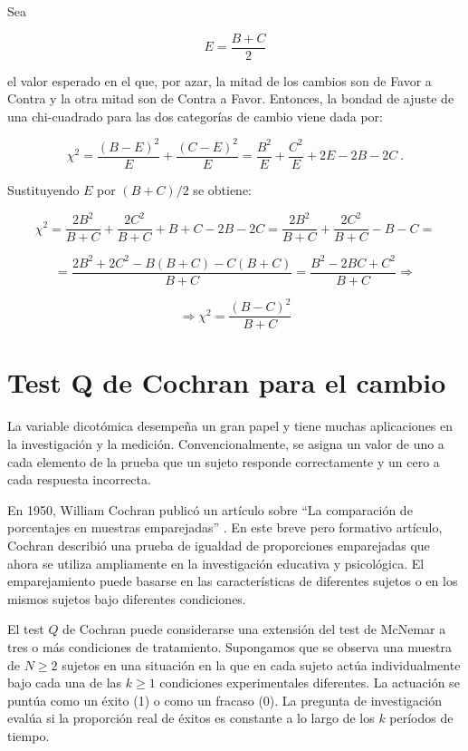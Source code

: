\documentclass[12pt,a4paper,]{book}
\numberwithin{dummy}{section}
\theoremstyle{ocrenumbox}
\theoremstyle{blacknumex}
\theoremstyle{blacknumbox}
\theoremstyle{ocrenum}
\theoremstyle{ocrenum}
\begin{document}
Sea

\[
E=\frac{B+C}{2}
\]

el valor esperado en el que, por azar, la mitad de los cambios son de
Favor a Contra y la otra mitad son de Contra a Favor. Entonces, la
bondad de ajuste de una chi-cuadrado para las dos categorías de cambio
viene dada por:

\[
\chi^2=\frac{(B-E)^2}{E}+\frac{(C-E)^2}{E}=\frac{B^2}{E}+\frac{C^2}{E}+2E-2B-2C~.
\]

Sustituyendo \(E\) por \((B + C)/2\) se obtiene:

\[
\chi^2=\frac{2B^2}{B+C}+\frac{2C^2}{B+C}+B+C-2B-2C=\frac{2B^2}{B+C}+\frac{2C^2}{B+C}-B-C=
\]

\[
=\frac{2B^2+2C^2-B(B+C)-C(B+C)}{B+C}=\frac{B^2-2BC+C^2}{B+C} \Rightarrow
\]

\[
\Rightarrow \chi^2=\frac{(B-C)^2}{B+C}
\]

\hypertarget{test-q-de-cochran-para-el-cambio}{%
\section{Test Q de Cochran para el
cambio}\label{test-q-de-cochran-para-el-cambio}}

La variable dicotómica desempeña un gran papel y tiene muchas
aplicaciones en la investigación y la medición. Convencionalmente, se
asigna un valor de uno a cada elemento de la prueba que un sujeto
responde correctamente y un cero a cada respuesta incorrecta.

En 1950, William Cochran publicó un artículo sobre ``La comparación de
porcentajes en muestras emparejadas'' \citep{Cochran1950}. En este breve
pero formativo artículo, Cochran describió una prueba de igualdad de
proporciones emparejadas que ahora se utiliza ampliamente en la
investigación educativa y psicológica. El emparejamiento puede basarse
en las características de diferentes sujetos o en los mismos sujetos
bajo diferentes condiciones.

El test \(Q\) de Cochran puede considerarse una extensión del test de
McNemar a tres o más condiciones de tratamiento. Supongamos que se
observa una muestra de \(N \ge 2\) sujetos en una situación en la que en
cada sujeto actúa individualmente bajo cada una de las \(k \ge 1\)
condiciones experimentales diferentes. La actuación se puntúa como un
éxito (1) o como un fracaso (0). La pregunta de investigación evalúa si
la proporción real de éxitos es constante a lo largo de los \(k\)
períodos de tiempo.
\end{document}
